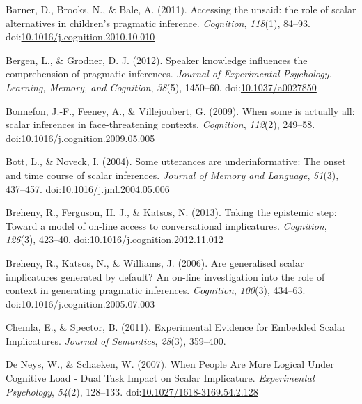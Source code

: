 \documentclass[floatsintext,man]{apa6}
\theoremstyle{definition}
\theoremstyle{definition}
\theoremstyle{definition}
\theoremstyle{remark}
\begin{document}
\setlength{\parindent}{-0.5in} \setlength{\leftskip}{0.5in}

\hypertarget{refs}{}
\hypertarget{ref-Barner2011}{}
Barner, D., Brooks, N., \& Bale, A. (2011). Accessing the unsaid: the
role of scalar alternatives in children's pragmatic inference.
\emph{Cognition}, \emph{118}(1), 84--93.
doi:\href{https://doi.org/10.1016/j.cognition.2010.10.010}{10.1016/j.cognition.2010.10.010}

\hypertarget{ref-Bergen2012}{}
Bergen, L., \& Grodner, D. J. (2012). Speaker knowledge influences the
comprehension of pragmatic inferences. \emph{Journal of Experimental
Psychology. Learning, Memory, and Cognition}, \emph{38}(5), 1450--60.
doi:\href{https://doi.org/10.1037/a0027850}{10.1037/a0027850}

\hypertarget{ref-Bonnefon2009}{}
Bonnefon, J.-F., Feeney, A., \& Villejoubert, G. (2009). When some is
actually all: scalar inferences in face-threatening contexts.
\emph{Cognition}, \emph{112}(2), 249--58.
doi:\href{https://doi.org/10.1016/j.cognition.2009.05.005}{10.1016/j.cognition.2009.05.005}

\hypertarget{ref-Bott2004}{}
Bott, L., \& Noveck, I. (2004). Some utterances are underinformative:
The onset and time course of scalar inferences. \emph{Journal of Memory
and Language}, \emph{51}(3), 437--457.
doi:\href{https://doi.org/10.1016/j.jml.2004.05.006}{10.1016/j.jml.2004.05.006}

\hypertarget{ref-Breheny2013}{}
Breheny, R., Ferguson, H. J., \& Katsos, N. (2013). Taking the epistemic
step: Toward a model of on-line access to conversational implicatures.
\emph{Cognition}, \emph{126}(3), 423--40.
doi:\href{https://doi.org/10.1016/j.cognition.2012.11.012}{10.1016/j.cognition.2012.11.012}

\hypertarget{ref-Breheny2006}{}
Breheny, R., Katsos, N., \& Williams, J. (2006). Are generalised scalar
implicatures generated by default? An on-line investigation into the
role of context in generating pragmatic inferences. \emph{Cognition},
\emph{100}(3), 434--63.
doi:\href{https://doi.org/10.1016/j.cognition.2005.07.003}{10.1016/j.cognition.2005.07.003}

\hypertarget{ref-Chemla2011}{}
Chemla, E., \& Spector, B. (2011). Experimental Evidence for Embedded
Scalar Implicatures. \emph{Journal of Semantics}, \emph{28}(3),
359--400.

\hypertarget{ref-DeNeys2007}{}
De Neys, W., \& Schaeken, W. (2007). When People Are More Logical Under
Cognitive Load - Dual Task Impact on Scalar Implicature.
\emph{Experimental Psychology}, \emph{54}(2), 128--133.
doi:\href{https://doi.org/10.1027/1618-3169.54.2.128}{10.1027/1618-3169.54.2.128}
\end{document}
